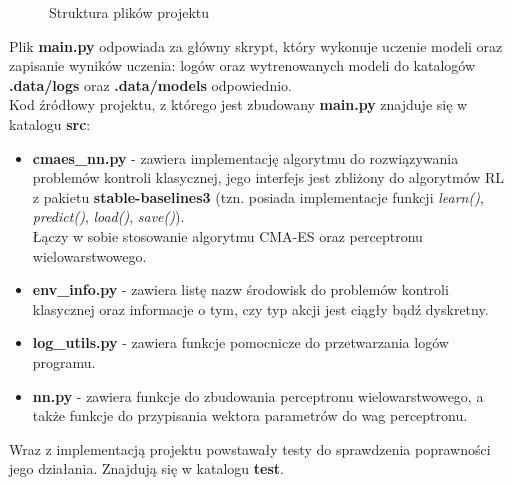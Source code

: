 \documentclass[12pt,a4paper]{article}
\begin{document}
\begin{figure}[!ht]
  \caption{Struktura plików projektu}
  \label{fig:dirtree}
\end{figure}

Plik \textbf{main.py} odpowiada za główny skrypt, który wykonuje uczenie
modeli oraz zapisanie wyników uczenia: logów oraz wytrenowanych modeli
do katalogów \textbf{.data/logs} oraz \textbf{.data/models} odpowiednio. \\

Kod źródłowy projektu, z którego jest zbudowany \textbf{main.py} znajduje się
w katalogu \textbf{src}:
\begin{itemize}
  \item \textbf{cmaes\_nn.py} - zawiera implementację algorytmu do rozwiązywania
        problemów kontroli klasycznej, jego interfejs jest zbliżony
        do algorytmów RL z pakietu \textbf{stable-baselines3}
        (tzn. posiada implementacje funkcji \emph{learn()}, \emph{predict()},
        \emph{load()}, \emph{save()}). \\
        Łączy w sobie stosowanie algorytmu CMA-ES oraz perceptronu wielowarstwowego.

  \item \textbf{env\_info.py} - zawiera listę nazw środowisk do problemów kontroli
        klasycznej oraz informacje o tym, czy typ akcji jest ciągły bądź dyskretny.

  \item \textbf{log\_utils.py} - zawiera funkcje pomocnicze do przetwarzania
        logów programu.

  \item \textbf{nn.py} - zawiera funkcje do zbudowania perceptronu
        wielowarstwowego, a także funkcje do przypisania wektora parametrów
        do wag perceptronu.
\end{itemize}

Wraz z implementacją projektu powstawały testy do sprawdzenia poprawności
jego działania. Znajdują się w katalogu \textbf{test}. \\
\end{document}
